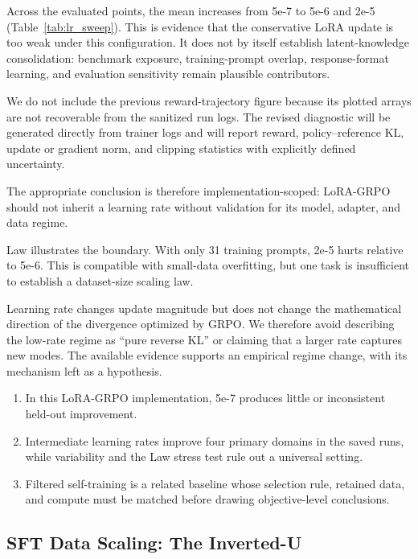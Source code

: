\documentclass[11pt]{article}
\begin{document}
Across the evaluated points, the mean increases from 5e-7 to 5e-6 and 2e-5 (Table~\ref{tab:lr_sweep}). This is evidence that the conservative LoRA update is too weak under this configuration. It does not by itself establish latent-knowledge consolidation: benchmark exposure, training-prompt overlap, response-format learning, and evaluation sensitivity remain plausible contributors.

We do not include the previous reward-trajectory figure because its plotted arrays are not recoverable from the sanitized run logs. The revised diagnostic will be generated directly from trainer logs and will report reward, policy--reference KL, update or gradient norm, and clipping statistics with explicitly defined uncertainty.

The appropriate conclusion is therefore implementation-scoped: LoRA-GRPO should not inherit a learning rate without validation for its model, adapter, and data regime.

Law illustrates the boundary. With only 31 training prompts, 2e-5 hurts relative to 5e-6. This is compatible with small-data overfitting, but one task is insufficient to establish a dataset-size scaling law.

Learning rate changes update magnitude but does not change the mathematical direction of the divergence optimized by GRPO. We therefore avoid describing the low-rate regime as ``pure reverse KL'' or claiming that a larger rate captures new modes. The available evidence supports an empirical regime change, with its mechanism left as a hypothesis.

\begin{takeawaybox}
\begin{enumerate}[leftmargin=*,nosep]
\item In this LoRA-GRPO implementation, 5e-7 produces little or inconsistent held-out improvement.
\item Intermediate learning rates improve four primary domains in the saved runs, while variability and the Law stress test rule out a universal setting.
\item Filtered self-training is a related baseline whose selection rule, retained data, and compute must be matched before drawing objective-level conclusions.
\end{enumerate}
\end{takeawaybox}

\subsection{SFT Data Scaling: The Inverted-U}
\label{sec:data_scaling}
\end{document}
